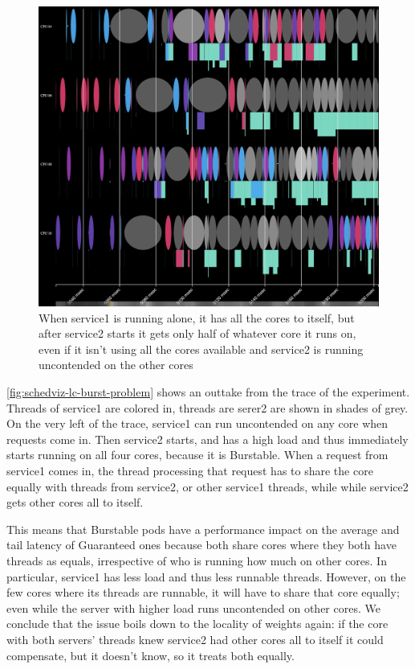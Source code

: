 \begin{figure}[t]
    \centering
    \includegraphics[width=\columnwidth]{graphs/schedviz-lc-burst-problem.png}
    \caption{When service1 is running alone, it has all the cores to itself, but
    after service2 starts it gets only half of whatever core it runs on, even if
    it isn't using all the cores available and service2 is running uncontended
    on the other cores}\label{fig:schedviz-lc-burst-problem}
\end{figure}

\autoref{fig:schedviz-lc-burst-problem} shows an outtake from the trace of the
experiment. Threads of service1 are colored in, threads are serer2 are shown in
shades of grey. On the very left of the trace, service1 can run uncontended on
any core when requests come in. Then service2 starts, and has a high load and
thus immediately starts running on all four cores, because it is Burstable. When
a request from service1 comes in, the thread processing that request has to
share the core equally with threads from service2, or other service1 threads,
while while service2 gets other cores all to itself.

This means that Burstable pods have a performance impact on the average and tail
latency of Guaranteed ones because both share cores where they both have threads
as equals, irrespective of who is running how much on other cores. In
particular, service1 has less load and thus less runnable threads. However, on
the few cores where its threads are runnable, it will have to share that core
equally; even while the server with higher load runs uncontended on other cores.
We conclude that the issue boils down to the locality of weights again: if the
core with both servers' threads knew service2 had other cores all to itself it
could compensate, but it doesn't know, so it treats both equally.


